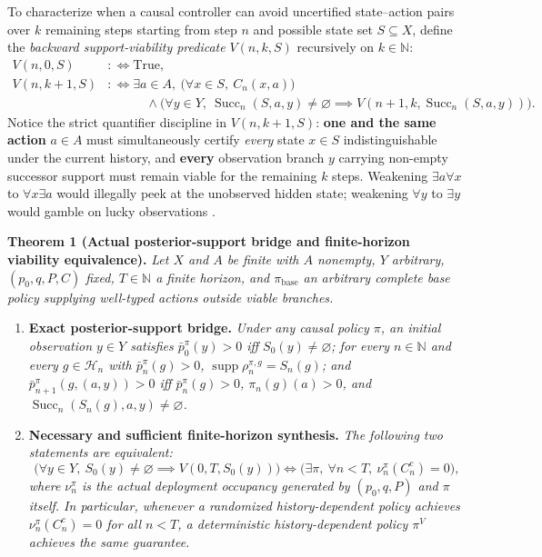 \documentclass[11pt,a4paper]{article}
\newcounter{none}
\providecommand{\tightlist}{\setlength{\itemsep}{2pt}\setlength{\parskip}{0pt}}
\begin{document}
To characterize when a causal controller can avoid uncertified
state--action pairs over \(k\) remaining steps starting from step \(n\)
and possible state set \(S \subseteq X\), define the \emph{backward
support-viability predicate} \(V(n, k, S)\) recursively on
\(k \in \mathbb{N}\): \[\begin{aligned}
V(n, 0, S) &:\iff \mathrm{True}, \\
V(n, k+1, S) &:\iff \exists a \in A,\ \bigl(\forall x \in S,\ C_n(x,a)\bigr) \\
&\qquad\quad \land \bigl(\forall y \in Y,\ \operatorname{Succ}_n(S,a,y) \neq \varnothing \implies V(n+1, k, \operatorname{Succ}_n(S,a,y))\bigr).
\end{aligned}\] Notice the strict quantifier discipline in
\(V(n, k+1, S)\): \textbf{one and the same action} \(a \in A\) must
simultaneously certify \emph{every} state \(x \in S\) indistinguishable
under the current history, and \textbf{every} observation branch \(y\)
carrying non-empty successor support must remain viable for the
remaining \(k\) steps. Weakening \(\exists a \forall x\) to
\(\forall x \exists a\) would illegally peek at the unobserved hidden
state; weakening \(\forall y\) to \(\exists y\) would gamble on lucky
observations \citep{madani2003, chatterjee2016}.

\textbf{Theorem 1 (Actual posterior-support bridge and finite-horizon
viability equivalence).} \emph{Let \(X\) and \(A\) be finite with \(A\)
nonempty, \(Y\) arbitrary, \((p_0, q, P, C)\) fixed,
\(T \in \mathbb{N}\) a finite horizon, and \(\pi_{\mathrm{base}}\) an
arbitrary complete base policy supplying well-typed actions outside
viable branches.}

\begin{enumerate}
\def\labelenumi{\arabic{enumi}.}
\tightlist
\item
  \textbf{Exact posterior-support bridge.} \emph{Under any causal policy
  \(\pi\), an initial observation \(y \in Y\) satisfies
  \(\bar{p}_0^\pi(y) > 0\) iff \(S_0(y) \neq \varnothing\); for every
  \(n \in \mathbb{N}\) and every \(g \in \mathcal{H}_n\) with
  \(\bar{p}_n^\pi(g) > 0\),
  \(\operatorname{supp}\rho_n^{\pi, g} = S_n(g)\); and
  \(\bar{p}_{n+1}^\pi(g, (a, y)) > 0\) iff \(\bar{p}_n^\pi(g) > 0\),
  \(\pi_n(g)(a) > 0\), and
  \(\operatorname{Succ}_n(S_n(g), a, y) \neq \varnothing\).}
\item
  \textbf{Necessary and sufficient finite-horizon synthesis.} \emph{The
  following two statements are equivalent:}
  \[\bigl(\forall y \in Y,\ S_0(y) \neq \varnothing \implies V(0, T, S_0(y))\bigr)
  \iff
  \bigl(\exists \pi,\ \forall n < T,\ \nu_n^\pi(C_n^c) = 0\bigr),\]
  \emph{where \(\nu_n^\pi\) is the actual deployment occupancy generated
  by \((p_0, q, P)\) and \(\pi\) itself. In particular, whenever a
  randomized history-dependent policy achieves \(\nu_n^\pi(C_n^c) = 0\)
  for all \(n < T\), a deterministic history-dependent policy \(\pi^V\)
  achieves the same guarantee.}
\end{enumerate}
\end{document}
